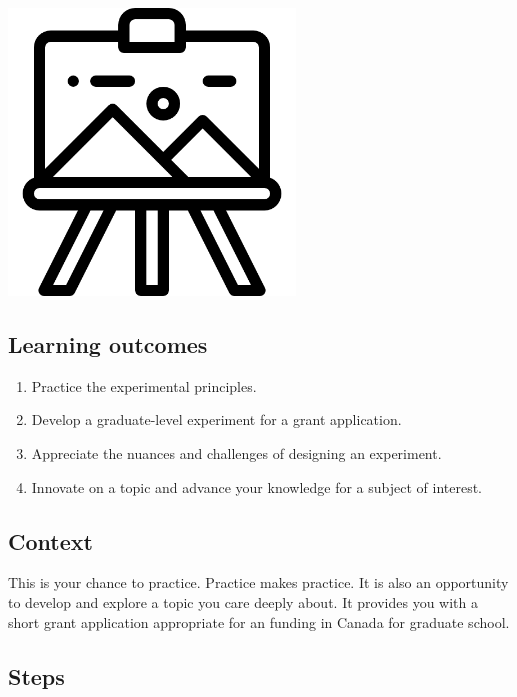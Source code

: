 \documentclass[
]{book}
\providecommand{\tightlist}{%
  \setlength{\itemsep}{0pt}\setlength{\parskip}{0pt}}
\begin{document}
\includegraphics[width=3in,height=\textheight]{./grant.png}

\hypertarget{learning-outcomes-2}{%
\subsection*{Learning outcomes}\label{learning-outcomes-2}}

\begin{enumerate}
\def\labelenumi{\arabic{enumi}.}
\tightlist
\item
  Practice the experimental principles.
\item
  Develop a graduate-level experiment for a grant application.\\
\item
  Appreciate the nuances and challenges of designing an experiment.\\
\item
  Innovate on a topic and advance your knowledge for a subject of interest.
\end{enumerate}

\hypertarget{context-1}{%
\subsection*{Context}\label{context-1}}

This is your chance to practice. Practice makes practice. It is also an opportunity to develop and explore a topic you care deeply about. It provides you with a short grant application appropriate for an funding in Canada for graduate school.

\hypertarget{steps-1}{%
\subsection*{Steps}\label{steps-1}}
\end{document}
